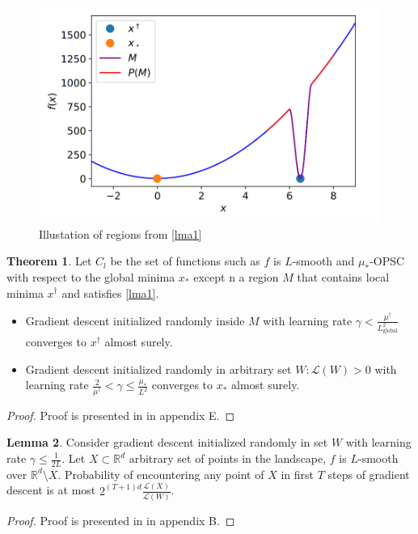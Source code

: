\documentclass{article}
\theoremstyle{definition}
\newtheorem{theorem}{Theorem}[section]
\newtheorem{lemma}[theorem]{Lemma}
\begin{document}
\begin{figure}[H]
    \caption{Illustation of regions from \cref{lma1}}
    \label{fig:func}
    \centering
    \includegraphics[scale=0.2]{lemma1}
\end{figure}

\begin{theorem}\label{thm1}
    Let $C_l$ be the set of functions such as $f$ is 
    $L$-smooth and $\mu_\ast$-OPSC with respect to the 
    global minima $x_\ast$ except n a region $M$ that 
    contains local minima $x^\dagger$ and satisfies \cref{lma1}.
    \begin{itemize}
        \item Gradient descent initialized randomly inside $M$ 
        with learning rate $\gamma < \frac{\mu^\dagger}{L^2_{\mathrm{global}}}$
        converges to $x^\dagger$ almost surely.
        
        \item Gradient descent initialized randomly in 
        arbitrary set $W: \mathcal{L}(W) > 0$ 
        with learning rate $\frac{2}{\mu^\dagger} < \gamma \leq \frac{\mu_\ast}{L^2}$
        converges to $x_\ast$ almost surely.

    \end{itemize} 

\end{theorem}
\begin{proof}
    Proof is presented in \cite{mohtashami2023special} in appendix E.
\end{proof}

\begin{lemma}\label{lma2}
    Consider gradient descent initialized randomly in set $W$ 
    with learning rate $\gamma \leq \frac{1}{2L}$.
    Let $X \subset \mathbb{R}^d$ arbitrary set of points in 
    the landscape, $f$ is $L$-smooth over 
    $\mathbb{R}^d \setminus X$. Probability of encountering 
    any point of $X$ in first $T$ steps of gradient descent is 
    at most $2 ^ {(T + 1)d} \frac{\mathcal{L}(X)}{\mathcal{L}(W)}$.
\end{lemma}
\begin{proof}
    Proof is presented in \cite{mohtashami2023special} in appendix B.
\end{proof}
\end{document}
